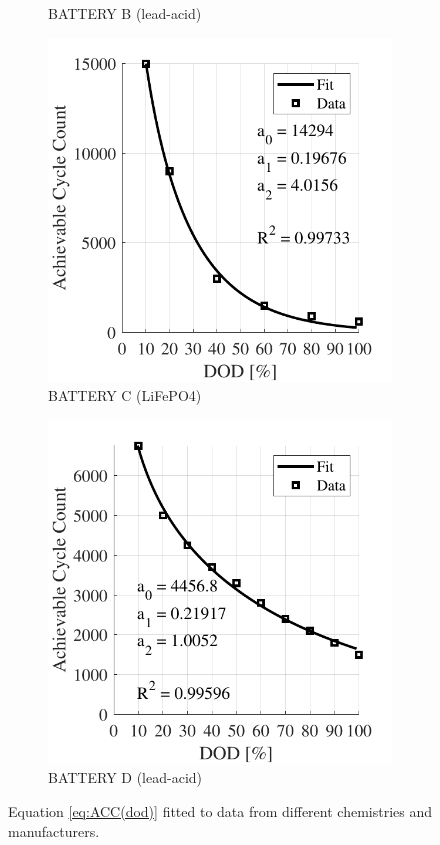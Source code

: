 \documentclass{ieeeaccess}
\begin{document}
\begin{figure}[!h]
\begin{subfigure}{.235\textwidth}
    		\caption{BATTERY B (lead-acid)}
    		\label{fig:accMoura}
    	\end{subfigure}
    	
    	\begin{subfigure}{.235\textwidth}
    		\centering
    		\includegraphics[width=.8\linewidth]{figures/acc_fitting_Unknown_model_LiPO4.pdf}
    		\caption{BATTERY C (LiFePO4)}
    		\label{fig:accLipeo4}
    	\end{subfigure}
    	\begin{subfigure}{.235\textwidth}
    		\centering
    		\includegraphics[width=.8\linewidth]{figures/acc_fitting_Rolls_16CH35P_lead-acid.pdf}
    		\caption{BATTERY D (lead-acid)}
    		\label{fig:accNimh}
    	\end{subfigure}
    	\caption{Equation \eqref{eq:ACC(dod)} fitted to data from different chemistries and manufacturers.}
    	\label{fig:acc(dod)}
    \end{figure}
\end{document}
